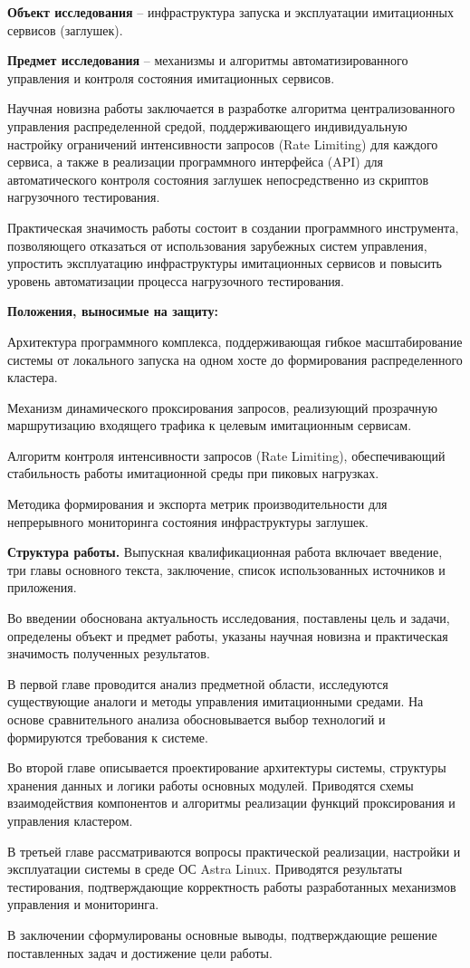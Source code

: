 \textbf{Объект исследования} -- инфраструктура запуска и эксплуатации имитационных сервисов (заглушек).

\textbf{Предмет исследования} -- механизмы и алгоритмы автоматизированного управления и контроля состояния имитационных сервисов.

Научная новизна работы заключается в разработке алгоритма централизованного управления распределенной средой, поддерживающего индивидуальную настройку ограничений интенсивности запросов (Rate Limiting) для каждого сервиса, а также в реализации программного интерфейса (API) для автоматического контроля состояния заглушек непосредственно из скриптов нагрузочного тестирования.

Практическая значимость работы состоит в создании программного инструмента, позволяющего отказаться от использования зарубежных систем управления, упростить эксплуатацию инфраструктуры имитационных сервисов и повысить уровень автоматизации процесса нагрузочного тестирования.

\textbf{Положения, выносимые на защиту:}
\begin{compactlist}
  \item Архитектура программного комплекса, поддерживающая гибкое масштабирование системы от локального запуска на одном хосте до формирования распределенного кластера.
  \item Механизм динамического проксирования запросов, реализующий прозрачную маршрутизацию входящего трафика к целевым имитационным сервисам.
  \item Алгоритм контроля интенсивности запросов (Rate Limiting), обеспечивающий стабильность работы имитационной среды при пиковых нагрузках.
  \item Методика формирования и экспорта метрик производительности для непрерывного мониторинга состояния инфраструктуры заглушек.
\end{compactlist}

\textbf{Структура работы.} Выпускная квалификационная работа включает введение, три главы основного текста, заключение, список использованных источников и приложения.

Во введении обоснована актуальность исследования, поставлены цель и задачи, определены объект и предмет работы, указаны научная новизна и практическая значимость полученных результатов.

В первой главе проводится анализ предметной области, исследуются существующие аналоги и методы управления имитационными средами. На основе сравнительного анализа обосновывается выбор технологий и формируются требования к системе.

Во второй главе описывается проектирование архитектуры системы, структуры хранения данных и логики работы основных модулей. Приводятся схемы взаимодействия компонентов и алгоритмы реализации функций проксирования и управления кластером.

В третьей главе рассматриваются вопросы практической реализации, настройки и эксплуатации системы в среде ОС Astra Linux. Приводятся результаты тестирования, подтверждающие корректность работы разработанных механизмов управления и мониторинга.

В заключении сформулированы основные выводы, подтверждающие решение поставленных задач и достижение цели работы.
